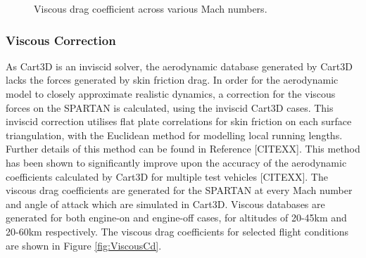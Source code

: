\begin{figure}
\begin{subfigure}{.5\textwidth}
							\end{subfigure}
						
							\caption{Viscous drag coefficient across various Mach numbers.}
							\label{fig:Cart3dValidation}
						\end{figure}

		\subsubsection{Viscous Correction}
		
		 As Cart3D is an inviscid solver, the aerodynamic database generated by Cart3D lacks the forces generated by skin friction drag. In order for the aerodynamic model to closely approximate realistic dynamics, a correction for the viscous forces on the SPARTAN is calculated, using the inviscid Cart3D cases. This inviscid correction utilises flat plate correlations for skin friction on each surface triangulation, with the Euclidean method for modelling local running lengths. Further details of this method can be found in Reference [CITEXX]. This method has been shown to significantly improve upon the accuracy of the aerodynamic coefficients calculated by Cart3D for multiple test vehicles [CITEXX]. The viscous drag coefficients are generated for the SPARTAN at every Mach number and angle of attack which are simulated in Cart3D. Viscous databases are generated for both engine-on and engine-off cases, for altitudes of 20-45km and 20-60km respectively. The viscous drag coefficients for selected flight conditions are shown in Figure \ref{fig:ViscousCd}.
		
